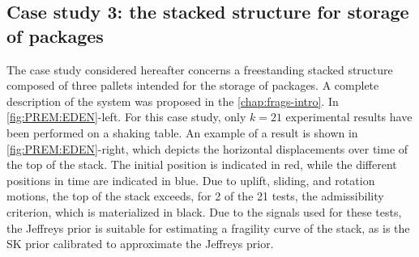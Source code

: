 





\subsection{Case study 3: the stacked structure for storage of packages}


The case study considered hereafter concerns a freestanding stacked structure composed of three pallets intended
for the storage of packages. A complete description of the system was proposed in the \cref{chap:frags-intro}. In \cref{fig:PREM:EDEN}-left. %
%
%
%
For this case study, only $k=21$
experimental results have been performed on a shaking table. %
An example of a result is
shown in \cref{fig:PREM:EDEN}-right, which depicts the horizontal displacements over time of the top of the stack. The initial position is
indicated in red, while the different positions in time are indicated in blue. Due to uplift, sliding, and rotation motions,
the top of the stack exceeds, for 2 of the 21 tests, the admissibility criterion, which is materialized in black. Due to
the signals used for these tests, the Jeffreys prior is suitable for estimating a fragility curve of the stack, as is the SK
prior calibrated to approximate the Jeffreys prior.


